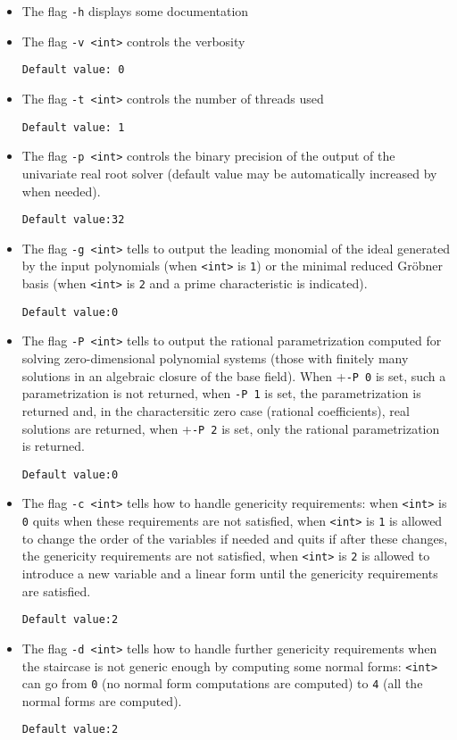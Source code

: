 \documentclass[a4paper,english,11pt]{scrartcl}
\theoremstyle{definition}
\theoremstyle{remark}
\begin{document}
\begin{itemize}
\item The flag \verb+-h+ displays some documentation

\item The flag \verb+-v <int>+ controls the verbosity

  \hfill \verb+Default value: 0+

\item The flag \verb+-t <int>+ controls the number of threads used

  \hfill \verb+Default value: 1+

\item The flag \verb+-p <int>+ controls the binary precision of the output of the 
    univariate real root
    solver (default value may be automatically increased by \msolve when needed).

    \hfill \verb+Default value:32+
\item The flag \verb+-g <int>+ tells \msolve to output the leading monomial of
  the ideal generated by the input polynomials (when \verb+<int>+ is \verb+1+)
  or the minimal reduced Gr\"obner basis (when \verb+<int>+ is \verb+2+ and
  a prime characteristic is indicated).

  \hfill \verb+Default value:0+

\item The flag \verb+-P <int>+ tells \msolve to output the 
rational parametrization computed for solving zero-dimensional polynomial 
systems (those with finitely many solutions in an algebraic closure of the base field).
When +\verb+-P 0+ is set, such a parametrization is not returned, when \verb+-P 1+ is
set, the parametrization is returned and, in the charactersitic zero case (rational 
coefficients), real solutions are returned, when +\verb+-P 2+ is set, only the 
rational parametrization is returned.

  \hfill \verb+Default value:0+


\item The flag \verb+-c <int>+ tells \msolve how to handle genericity
  requirements: when \verb+<int>+ is \verb+0+ \msolve quits when these
  requirements are not satisfied, when \verb+<int>+ is \verb+1+ \msolve is
  allowed to change the order of the variables if needed and quits if after
  these changes, the genericity requirements are not satisfied,  when
  \verb+<int>+ is \verb+2+ \msolve is allowed to introduce a new variable and a
  linear form until the genericity requirements are satisfied. 

  \hfill \verb+Default value:2+

\item The flag \verb+-d <int>+ tells \msolve how to handle further genericity
  requirements when the staircase is not generic enough by computing some normal forms:
  \verb+<int>+ can go from \verb+0+ (no normal form computations are computed) to
  \verb+4+ (all the normal forms are computed). 

  \hfill \verb+Default value:2+
  
\end{itemize}
\end{document}
